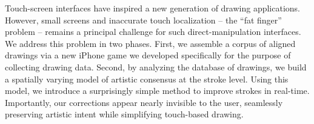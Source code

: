 Touch-screen interfaces have inspired a new generation of drawing
applications. However, small screens and inaccurate touch
localization -- the ``fat finger'' problem -- remains a principal
challenge for such direct-manipulation interfaces. We address this
problem in two phases. First, we assemble a corpus of aligned
drawings via a new iPhone game we developed specifically for the
purpose of collecting drawing data. Second, by analyzing the
database of drawings, we build a spatially varying model of artistic
consensus at the stroke level. Using this model, we introduce a
surprisingly simple method to improve strokes in real-time.
Importantly, our corrections appear nearly invisible to the user,
seamlessly preserving artistic intent while simplifying touch-based
drawing.